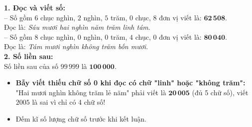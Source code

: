 \documentclass[11pt,a4paper]{article}
\begin{document}
\vspace{-2.5mm}
\noindent
\begin{minipage}[t]{0.49\textwidth}\vspace{0pt}
\begin{tcolorbox}[
  enhanced,
  colback=green!4!white,
  colframe=green!60!black,
  arc=2mm, boxrule=0.8pt,
  left=2mm, right=2mm, top=1.8mm, bottom=1.8mm,
  title={\footnotesize\bfseries\color{white}\faCheckCircle\ Ví dụ thực hành chuẩn mực}
]
{\footnotesize
\textbf{1. Đọc và viết số:}\\
-- Số gồm $6$ chục nghìn, $2$ nghìn, $5$ trăm, $0$ chục, $8$ đơn vị viết là: $\mathbf{62\,508}$.\\
Đọc là: \textit{Sáu mươi hai nghìn năm trăm linh tám}.\\
-- Số gồm $8$ chục nghìn, $0$ nghìn, $0$ trăm, $4$ chục, $0$ đơn vị viết là: $\mathbf{80\,040}$.\\
Đọc là: \textit{Tám mươi nghìn không trăm bốn mươi}.\\
\textbf{2. Số liền sau:}\\
Số liền sau của số $99\,999$ là $\mathbf{100\,000}$.
}
\end{tcolorbox}
\end{minipage}
\hfill
\begin{minipage}[t]{0.49\textwidth}\vspace{0pt}
\begin{tcolorbox}[
  enhanced,
  colback=red!4!white,
  colframe=red!70!black,
  arc=2mm, boxrule=0.8pt,
  left=2mm, right=2mm, top=1.8mm, bottom=1.8mm,
  title={\footnotesize\bfseries\color{white}\faExclamationTriangle\ Mẹo tránh bẫy trắc nghiệm}
]
{\footnotesize
\begin{itemize}\setlength{\itemsep}{1.5pt}\setlength{\leftskip}{-2.5mm}
  \item \textbf{Bẫy viết thiếu chữ số 0 khi đọc có chữ "linh" hoặc "không trăm":}\\
  "Hai mươi nghìn không trăm lẻ năm" phải viết là $\mathbf{20\,005}$ (đủ 5 chữ số), viết $2005$ là sai vì chỉ có 4 chữ số!
  \item Đếm kĩ số lượng chữ số trước khi kết luận.
\end{itemize}
}
\end{tcolorbox}
\end{minipage}
\end{document}
